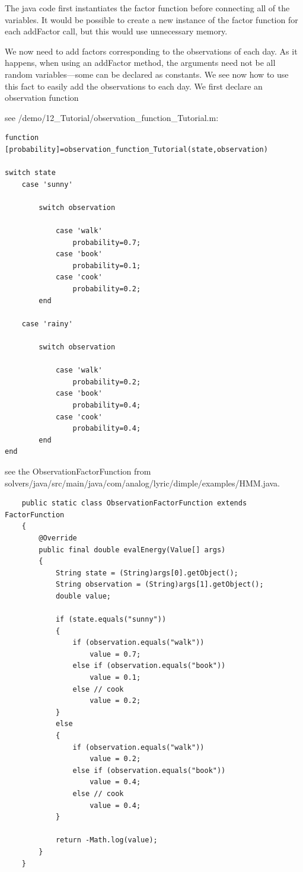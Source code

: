 The java code first instantiates the factor function before connecting all of the variables.  It would be possible to create a new instance of the factor function for each addFactor call, but this would use unnecessary memory.

\fi

We now need to add factors corresponding to the observations of each day. As it happens, when using an addFactor method, the arguments need not be all random variables---some can be declared as constants. We see now how to use this fact to easily add the observations to each day. We first declare an observation function 

\ifmatlab

see /demo/12\_Tutorial/observation\_function\_Tutorial.m:


\begin{lstlisting}
function [probability]=observation_function_Tutorial(state,observation)
 
switch state    
    case 'sunny'
        
        switch observation
            
            case 'walk'
                probability=0.7;
            case 'book'
                probability=0.1;
            case 'cook'
                probability=0.2;
        end
        
    case 'rainy'
        
        switch observation
           
            case 'walk'
                probability=0.2;
            case 'book'
                probability=0.4;
            case 'cook'
                probability=0.4;
        end
end
\end{lstlisting}

\fi

\ifjava

see the ObservationFactorFunction from solvers/java/src/main/java/com/analog/lyric/dimple/examples/HMM.java.

\begin{lstlisting}
	public static class ObservationFactorFunction extends FactorFunction
	{
		@Override
		public final double evalEnergy(Value[] args)
		{
			String state = (String)args[0].getObject();
			String observation = (String)args[1].getObject();
			double value;
			
			if (state.equals("sunny"))
			{
				if (observation.equals("walk"))
					value = 0.7;
				else if (observation.equals("book"))
					value = 0.1;
				else // cook
					value = 0.2;
			}
			else
			{
				if (observation.equals("walk"))
					value = 0.2;
				else if (observation.equals("book"))
					value = 0.4;
				else // cook
					value = 0.4;
			}
			
			return -Math.log(value);
		}
	}
\end{lstlisting}

